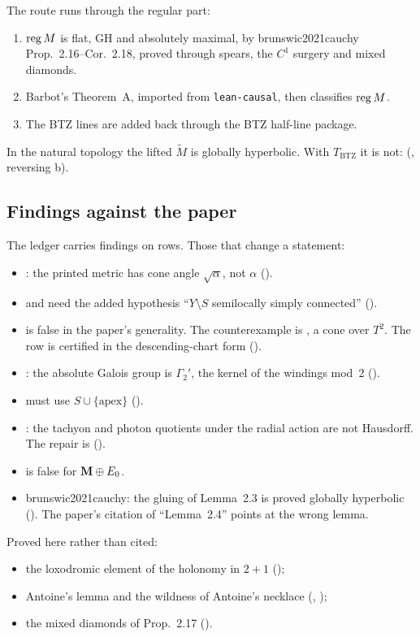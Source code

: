The route runs through the regular part:
\begin{enumerate}
\item $\operatorname{reg} M$ is flat, GH and absolutely maximal, by brunswic2021cauchy Prop.~2.16--Cor.~2.18,
  proved through spears, the $C^1$ surgery and mixed diamonds.
\item Barbot's Theorem~A, imported from \texttt{lean-causal}, then classifies $\operatorname{reg} M$.
\item The BTZ lines are added back through the BTZ half-line package.
\end{enumerate}
In the natural topology the lifted $\widetilde M$ is globally hyperbolic. With $T_{\mathrm{BTZ}}$
it is not:  (, reversing b).

\subsection{Findings against the paper}

The ledger carries \numGxFindings{} findings on \numGxFindingrows{} rows. Those that change a
statement:
\begin{itemize}
\item {}: the printed metric has cone angle $\sqrt\alpha$, not $\alpha$
  ().
\item {} and  need the added hypothesis
  ``$Y\setminus S$ semilocally simply connected'' ().
\item {} is false in the paper's generality. The counterexample is
  , a cone over $T^2$. The row is certified in the descending-chart form
  ().
\item {}: the absolute Galois group is $\Gamma_2'$, the
  kernel of the windings mod~2 ().
\item {} must use $S\cup\{\text{apex}\}$
  ().
\item {}: the tachyon and photon quotients under the radial action are not
  Hausdorff. The repair is  ().
\item {} is false for $\mathbf{M}\oplus E_0$.
\item brunswic2021cauchy: the gluing of Lemma~2.3 is proved globally hyperbolic (). The
  paper's citation of ``Lemma~2.4'' points at the wrong lemma.
\end{itemize}
Proved here rather than cited:
\begin{itemize}
\item the loxodromic element of the holonomy in $2+1$ ();
\item Antoine's lemma and the wildness of Antoine's necklace (, );
\item the mixed diamonds of Prop.~2.17 ().
\end{itemize}

